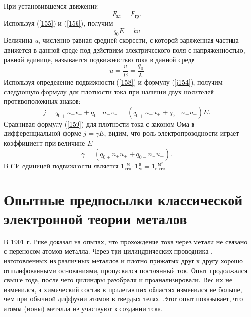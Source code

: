 \documentclass[a4paper,10pt]{book}
\begin{document}
При установившемся движении 
\begin{equation*}
 F_\text{эл} = F_\text{тр}.
\end{equation*}
Используя (\ref{155}) и (\ref{156}), получим 
\begin{equation}\label{157}
 q_0E = kv
\end{equation}
Величина $u$, численно равная средней скорости, с которой заряженная частица движется в данной среде под действием электрического поля с 
напряженностью, равной единице, называется подвижностью тока в данной среде 
\begin{equation}\label{158}
 u = \frac{v}{E} = \frac{q_0}{k}
\end{equation}
Используя определение подвижности (\ref{158}) и формулу (\ref{j154}), получим следующую формулу для плотности тока при наличии двух носителей
противоположных знаков:
\begin{equation}\label{159}
 j = q_{0+}n_+v_+ + q_{0-}n_-v_- = (q_{0+}n_+u_+ + q_{0-}n_-u_-)E.
\end{equation}
Сравнивая формулу (\ref{159}) для плотности тока с законом Ома в дифференциальной форме $j = \gamma E$, видим, что роль электропроводности играет
коэффициент при величине $E$
\begin{equation}\label{1510}
 \gamma = (q_{0+}n_+u_+ + q_{0-}n_-u_-).
\end{equation}
В СИ единицей подвижности является $1\frac{\text{м}}{\text{сек}}:1\frac{\text{в}}{\text{м}} = 1\frac{\text{м}^2}{\text{в}\cdot\text{сек}}$.
\section{Опытные предпосылки классической электронной теории металов}
В 1901 г. Рике доказал на опытах, что прохождение тока через металл не связано с переносом атомов металла. Через три цилиндрических проводника
, изготовленных из различных металлов и плотно прижатых друг к другу хорошо отшлифованными основаниями, пропускался постоянный ток. Опыт продолжался
свыше года, после чего цилиндры разобрали и проанализировали. Вес их не изменился, а химический состав в прилегавших областях изменился не больше, чем 
при обычной диффузии атомов в твердых телах. Этот опыт показывает, что атомы (ионы) металла не участвуют в создании тока.
\end{document}
